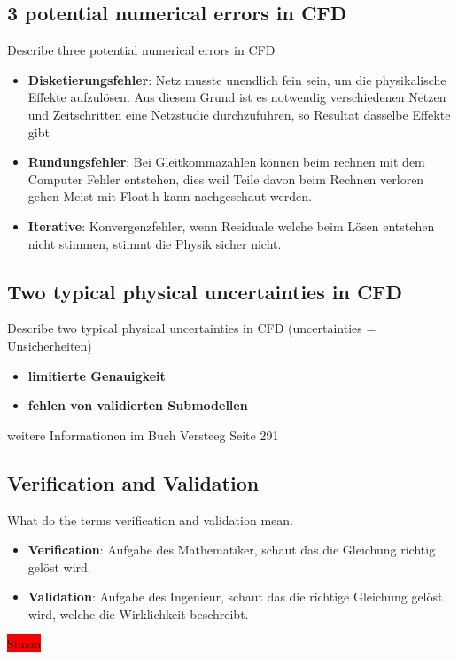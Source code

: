 \documentclass[a4paper]{scrartcl}
\begin{document}
\subsection{3 potential numerical errors in CFD}

Describe three potential numerical errors in CFD
\begin{itemize}
\item \textbf{Disketierungsfehler}: Netz musste unendlich fein sein, um die physikalische Effekte aufzulösen. Aus diesem Grund ist es notwendig verschiedenen Netzen und Zeitschritten eine Netzstudie durchzuführen, so Resultat dasselbe Effekte gibt
\item \textbf{Rundungsfehler}: Bei Gleitkommazahlen können beim rechnen mit dem Computer Fehler entstehen, dies weil Teile davon beim Rechnen verloren  gehen Meist mit Float.h kann nachgeschaut werden.
\item \textbf{Iterative}: Konvergenzfehler, wenn Residuale welche beim Lösen entstehen nicht stimmen, stimmt die Physik sicher nicht.  
\end{itemize}

\subsection{Two typical physical uncertainties in CFD}
Describe two typical physical uncertainties in CFD (uncertainties =
Unsicherheiten)
\begin{itemize}
\item \textbf{limitierte Genauigkeit}
\item \textbf{fehlen von validierten Submodellen}
\end{itemize}
weitere Informationen im Buch Versteeg Seite 291

\subsection{Verification and Validation} 
What do the terms verification and
validation mean.
\begin{itemize}
\item \textbf{Verification}: Aufgabe des Mathematiker, schaut das die Gleichung richtig gelöst wird.
\item \textbf{Validation}: Aufgabe des Ingenieur, schaut das die richtige Gleichung gelöst wird, welche die Wirklichkeit beschreibt.
\end{itemize}


\colorbox{red}{Simon}
\end{document}
